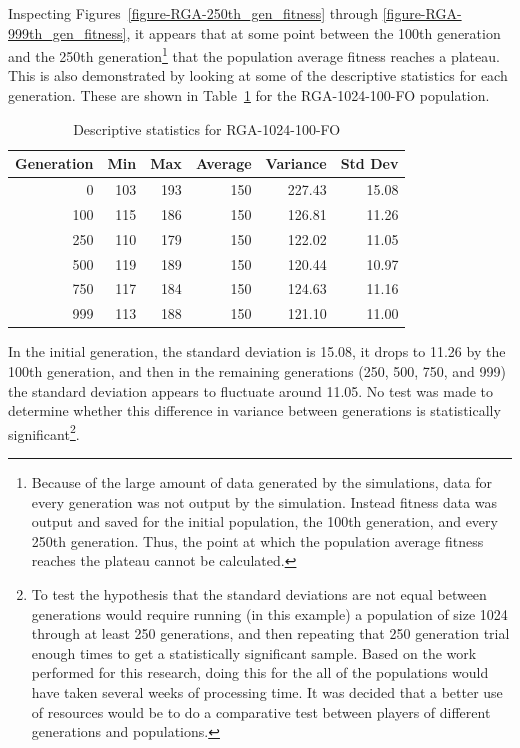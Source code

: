 Inspecting Figures~\ref{figure-RGA-250th_gen_fitness} through
\ref{figure-RGA-999th_gen_fitness}, it appears that at some point between the
100th generation and the 250th generation\footnote{Because of the large amount
of data generated by the simulations, data for every generation was not output
by the simulation. Instead fitness data was output and saved for the initial
population, the 100th generation, and every 250th generation. Thus, the point at
which the population average fitness reaches the plateau cannot be calculated.}
that the population average fitness reaches a plateau. This is also demonstrated
by looking at some of the descriptive statistics for each generation. These are
shown in Table~\ref{table-stats-for-s1024-n100-fo} for the RGA-1024-100-FO
population.

\begin{table}[ht]
\begin{center}
\caption[RGA-1024-100-FO statistics]{Descriptive statistics for RGA-1024-100-FO}
\begin{tabular}{ | r || r | r | r | r | r |}
\hline
Generation & Min & Max & Average & Variance & Std Dev \\ \hline \hline
0   & 103 & 193 & 150 & 227.43 & 15.08 \\ \hline
100 & 115 & 186 & 150 & 126.81 & 11.26 \\ \hline
250 & 110 & 179 & 150 & 122.02 & 11.05 \\ \hline
500 & 119 & 189 & 150 & 120.44 & 10.97 \\ \hline
750 & 117 & 184 & 150 & 124.63 & 11.16 \\ \hline
999 & 113 & 188 & 150 & 121.10 & 11.00 \\ \hline
\end{tabular}
\label{table-stats-for-s1024-n100-fo}
\end{center}
\end{table}

In the initial generation, the standard deviation is 15.08, it drops to 11.26 by
the 100th generation, and then in the remaining generations (250, 500, 750, and
999) the standard deviation appears to fluctuate around 11.05. No test was
made to determine whether this difference in variance between
generations is statistically significant\footnote{To test the hypothesis that the standard
deviations are not equal between generations would require running (in this
example) a population of size 1024 through at least 250 generations, and then
repeating that 250 generation trial enough times to get a statistically
significant sample. Based on the work performed for this research, doing this
for the all of the populations would have taken several weeks of processing
time. It was decided that a better use of resources would be to do a comparative
test between players of different generations and populations.}.

